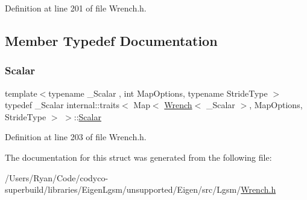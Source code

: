 Definition at line 201 of file Wrench.\+h.



\subsection{Member Typedef Documentation}
\hypertarget{structinternal_1_1traits_3_01_map_3_01_wrench_3_01___scalar_01_4_00_01_map_options_00_01_stride_type_01_4_01_4_a6983b7aa4af5e3133aee4135b962a8a9}{}\label{structinternal_1_1traits_3_01_map_3_01_wrench_3_01___scalar_01_4_00_01_map_options_00_01_stride_type_01_4_01_4_a6983b7aa4af5e3133aee4135b962a8a9} 
\subsubsection{\texorpdfstring{Scalar}{Scalar}}
{\footnotesize\ttfamily template$<$typename \+\_\+\+Scalar , int Map\+Options, typename Stride\+Type $>$ \\
typedef \+\_\+\+Scalar internal\+::traits$<$ Map$<$ \hyperlink{class_wrench}{Wrench}$<$ \+\_\+\+Scalar $>$, Map\+Options, Stride\+Type $>$ $>$\+::\hyperlink{structinternal_1_1traits_3_01_map_3_01_wrench_3_01___scalar_01_4_00_01_map_options_00_01_stride_type_01_4_01_4_a6983b7aa4af5e3133aee4135b962a8a9}{Scalar}}



Definition at line 203 of file Wrench.\+h.



The documentation for this struct was generated from the following file\+:\begin{DoxyCompactItemize}
\item 
/\+Users/\+Ryan/\+Code/codyco-\/superbuild/libraries/\+Eigen\+Lgsm/unsupported/\+Eigen/src/\+Lgsm/\hyperlink{_wrench_8h}{Wrench.\+h}\end{DoxyCompactItemize}
